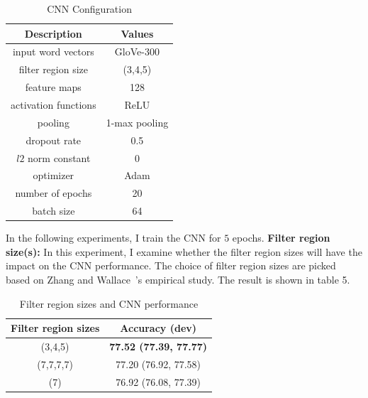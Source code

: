 \documentclass[11pt,a4paper]{article}
\begin{document}
\begin{table}
\captionsetup{size=footnotesize}
\caption{CNN Configuration}
\footnotesize\centering

\smallskip 
\begin{tabular*}{\columnwidth}{@{\extracolsep{\fill}}cc}
\toprule
  Description  & Values  \\
\midrule
input word vectors & GloVe-300      \\
filter region size & (3,4,5) \\
feature maps &    128    \\
activation functions & ReLU        \\
pooling & 1-max pooling        \\
dropout rate & 0.5 \\
$l2$ norm constant & 0 \\
optimizer & Adam \\
number of epochs & 20 \\
batch size & 64 \\
\bottomrule
\end{tabular*}
\end{table}

In the following experiments, I train the CNN for $5$ epochs. 
\textbf{Filter region size(s):}
In this experiment, I examine whether the filter region sizes will have
the impact on the CNN performance. The choice of filter region sizes are 
picked based on Zhang and Wallace~'s empirical study. 
The result is shown in table 5. 

\begin{table}[!htb]
\captionsetup{size=footnotesize}
\caption{Filter region sizes and CNN performance} \label{tab:freq}
\setlength\tabcolsep{0pt} %
\footnotesize\centering

\smallskip 
\begin{tabular*}{\columnwidth}{@{\extracolsep{\fill}}cc}
\toprule
  Filter region sizes  &   Accuracy (dev) \\
\midrule
(3,4,5)    &  \textbf{77.52 (77.39, 77.77)}     \\
(7,7,7,7)  &  77.20 (76.92, 77.58)     \\
(7)        &  76.92 (76.08, 77.39)     \\
\bottomrule
\end{tabular*}
\end{table}
\end{document}

